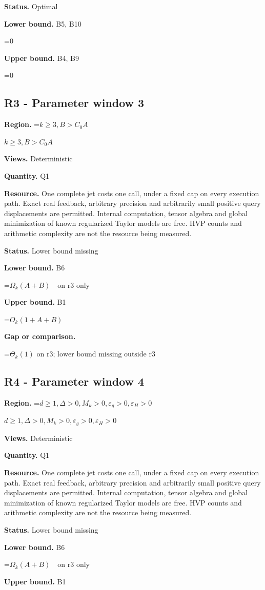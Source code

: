 \documentclass[10pt,a4paper]{article}
\newcommand{\AtlasMath}[1]{\par\begingroup\centering\setbox0=\hbox{$\displaystyle #1$}\ifdim\wd0>1.4\linewidth\typeout{ATLAS WIDE FORMULA: \the\wd0}\fi\ifdim\wd0>\linewidth\resizebox{\linewidth}{!}{\box0}\else\box0\fi\par\endgroup}
\newcommand{\AtlasInlineMath}[1]{\begingroup\setbox0=\hbox{$#1$}\ifdim\wd0>.4\linewidth\endgroup\AtlasMath{#1}\else\endgroup$#1$\fi}
\begin{document}
\textbf{Status.} Optimal

\textbf{Lower bound.} B5, B10

\AtlasMath{0}
\textbf{Upper bound.} B4, B9

\AtlasMath{0}
\subsection{R3 - Parameter window 3}
\textbf{Region.} \AtlasInlineMath{k\ge 3,B>C_0 A}

\textbf{Views.} Deterministic

\textbf{Quantity.} Q1

\textbf{Resource.} One complete jet costs one call, under a fixed cap on every execution path. Exact real feedback, arbitrary precision and arbitrarily small positive query displacements are permitted. Internal computation, tensor algebra and global minimization of known regularized Taylor models are free. HVP counts and arithmetic complexity are not the resource being measured.

\textbf{Status.} Lower bound missing

\textbf{Lower bound.} B6

\AtlasMath{\Omega_k(A+B)\quad\text{on r3 only}}
\textbf{Upper bound.} B1

\AtlasMath{O_k(1+A+B)}
\textbf{Gap or comparison.}

\AtlasMath{\Theta_k(1)\text{ on r3; lower bound missing outside r3}}
\subsection{R4 - Parameter window 4}
\textbf{Region.} \AtlasInlineMath{d\ge 1,\Delta>0,M_k>0,\varepsilon_g>0,\varepsilon_H>0}

\textbf{Views.} Deterministic

\textbf{Quantity.} Q1

\textbf{Resource.} One complete jet costs one call, under a fixed cap on every execution path. Exact real feedback, arbitrary precision and arbitrarily small positive query displacements are permitted. Internal computation, tensor algebra and global minimization of known regularized Taylor models are free. HVP counts and arithmetic complexity are not the resource being measured.

\textbf{Status.} Lower bound missing

\textbf{Lower bound.} B6

\AtlasMath{\Omega_k(A+B)\quad\text{on r3 only}}
\textbf{Upper bound.} B1
\end{document}
